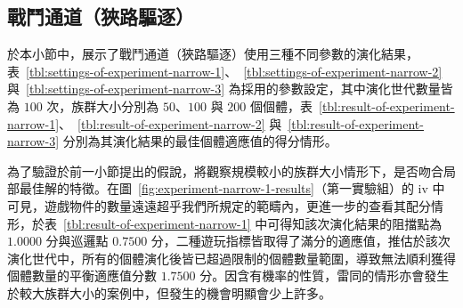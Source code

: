 \clearpage

\subsection{戰鬥通道（狹路驅逐）}
\label{ssec:experiment-results-narrow}

於本小節中，展示了戰鬥通道（狹路驅逐）使用三種不同參數的演化結果，表~\ref{tbl:settings-of-experiment-narrow-1}、~\ref{tbl:settings-of-experiment-narrow-2} 與~\ref{tbl:settings-of-experiment-narrow-3} 為採用的參數設定，其中演化世代數量皆為 $100$ 次，族群大小分別為 $50$、$100$ 與 $200$ 個個體，表~\ref{tbl:result-of-experiment-narrow-1}、~\ref{tbl:result-of-experiment-narrow-2} 與~\ref{tbl:result-of-experiment-narrow-3} 分別為其演化結果的最佳個體適應值的得分情形。

為了驗證於前一小節提出的假說，將觀察規模較小的族群大小情形下，是否吻合局部最佳解的特徵。在圖~\ref{fig:experiment-narrow-1-results}（第一實驗組）的 iv 中可見，遊戲物件的數量遠遠超乎我們所規定的範疇內，更進一步的查看其配分情形，於表~\ref{tbl:result-of-experiment-narrow-1} 中可得知該次演化結果的阻擋點為 $1.0000$ 分與巡邏點 $0.7500$ 分，二種遊玩指標皆取得了滿分的適應值，推估於該次演化世代中，所有的個體演化後皆已超過限制的個體數量範圍，導致無法順利獲得個體數量的平衡適應值分數 $1.7500$ 分。因含有機率的性質，雷同的情形亦會發生於較大族群大小的案例中，但發生的機會明顯會少上許多。


